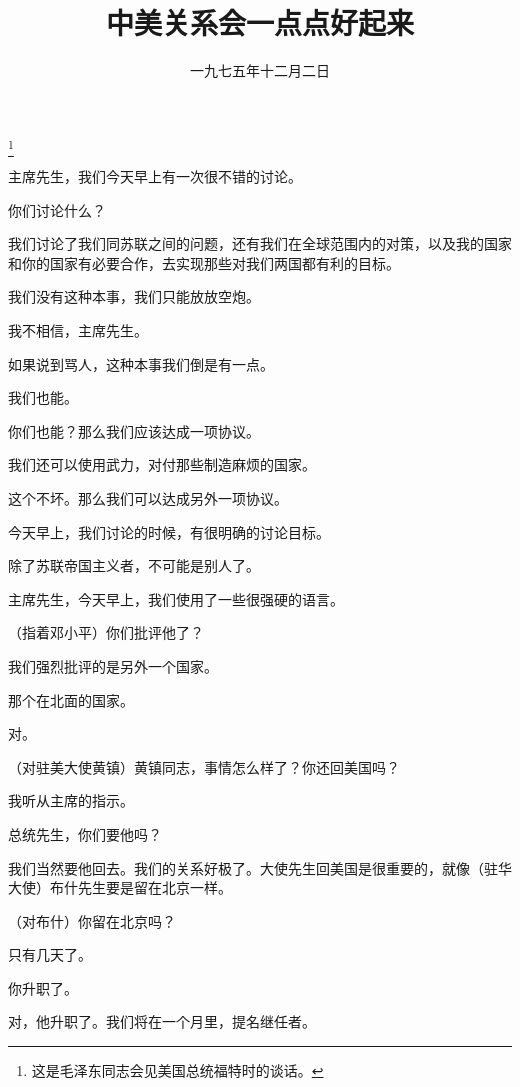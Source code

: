 
\title{中美关系会一点点好起来}
\date{一九七五年十二月二日}
\thanks{这是毛泽东同志会见美国总统福特时的谈话。}
\maketitle


主席先生，我们今天早上有一次很不错的讨论。

你们讨论什么？

我们讨论了我们同苏联之间的问题，还有我们在全球范围内的对策，以及我的国家和你的国家有必要合作，去实现那些对我们两国都有利的目标。

我们没有这种本事，我们只能放放空炮。

我不相信，主席先生。

如果说到骂人，这种本事我们倒是有一点。

我们也能。

你们也能？那么我们应该达成一项协议。

我们还可以使用武力，对付那些制造麻烦的国家。

这个不坏。那么我们可以达成另外一项协议。

今天早上，我们讨论的时候，有很明确的讨论目标。

除了苏联帝国主义者，不可能是别人了。

主席先生，今天早上，我们使用了一些很强硬的语言。

（指着邓小平）你们批评他了？

我们强烈批评的是另外一个国家。

那个在北面的国家。

对。

（对驻美大使黄镇）黄镇同志，事情怎么样了？你还回美国吗？

我听从主席的指示。

总统先生，你们要他吗？

我们当然要他回去。我们的关系好极了。大使先生回美国是很重要的，就像（驻华大使）布什先生要是留在北京一样。

（对布什）你留在北京吗？

只有几天了。

你升职了。

对，他升职了。我们将在一个月里，提名继任者。

